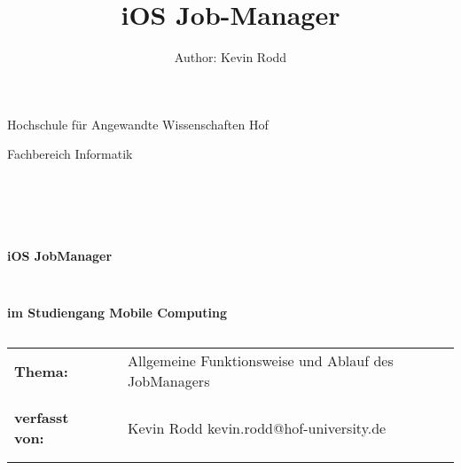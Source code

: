 \documentclass[a4paper, 12pt]{article}
\author{Author: Kevin Rodd}
\title{iOS Job-Manager}
\begin{document}
\thispagestyle{empty}
\begin{center}
\Large{Hochschule für Angewandte Wissenschaften Hof}\\
\end{center}


\begin{center}
\Large{Fachbereich Informatik}
\end{center}
\begin{verbatim}





\end{verbatim}
\begin{center}
\textbf{\LARGE{iOS JobManager}}
\end{center}
\begin{verbatim}


\end{verbatim}
\begin{center}
\textbf{im Studiengang Mobile Computing}
\end{center}
\begin{verbatim}
\end{verbatim}

\begin{flushleft}
\begin{tabular}{lll}
\textbf{Thema:} & & Allgemeine Funktionsweise und Ablauf des JobManagers \\

& & \\
& & \\
\textbf{verfasst von:} & & Kevin Rodd \flq{}kevin.rodd@hof-university.de\frq{}\\
& & \\
& & \\
\end{tabular}
\end{flushleft}


\newpage

\tableofcontents

\newpage
\end{document}
